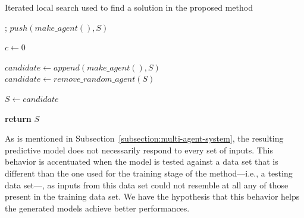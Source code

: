 \documentclass{ieeeaccess}
\begin{document}
\begin{algorithm}
  \caption{Iterated local search used to find a solution in the proposed method}
  \label{algorithm:ils}
  \begin{algorithmic}[1]
    ;
    \State $push(make\_agent(), S)$ %

    \State $c \gets 0$

    \State $candidate \gets append(make\_agent(), S)$
    \Else
    \State $candidate \gets remove\_random\_agent(S)$
    \EndIf

    \State $S \gets candidate$
    \EndIf
    
    \EndWhile

    \State \textbf{return} $S$
    \EndProcedure
  \end{algorithmic}
\end{algorithm}

As is mentioned in Subsection~\ref{subsection:multi-agent-system}, the
resulting predictive model does not necessarily respond to every set
of inputs. This behavior is accentuated when the model is tested
against a data set that is different than the one used for the
training stage of the method---i.e., a testing data set---, as inputs
from this data set could not resemble at all any of those present in
the training data set. We have the hypothesis that this behavior helps
the generated models achieve better performances.


\end{document}
